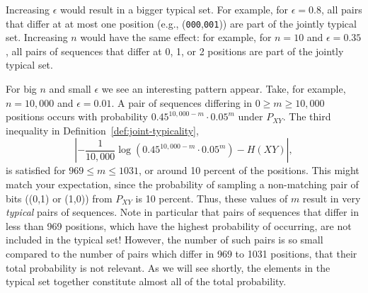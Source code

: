 \begin{example}
Increasing $\epsilon$ would result in a bigger typical set. For example, for $\epsilon = 0.8$, all pairs that differ at at most one position (e.g., (\texttt{000},\texttt{001})) are part of the jointly typical set. Increasing $n$ would have the same effect: for example, for $n = 10$ and $\epsilon = 0.35$, all pairs of sequences that differ at 0, 1, or 2 positions are part of the jointly typical set.

For big $n$ and small $\epsilon$ we see an interesting pattern appear. Take, for example, $n = 10,000$ and $\epsilon = 0.01$. A pair of sequences differing in $0 \geq m \geq 10,000$ positions occurs with probability $0.45^{10,000 - m} \cdot 0.05^m$ under $P_{XY}$. The third inequality in Definition~\ref{def:joint-typicality}, 
\[
\left| -\frac{1}{10,000} \log (0.45^{10,000 - m} \cdot 0.05^m) - H(XY)\right|,
\]
is satisfied for $969 \leq m \leq 1031$, or around 10 percent of the positions. This might match your expectation, since the probability of sampling a non-matching pair of bits ((0,1) or (1,0)) from $P_{XY}$ is 10 percent. Thus, these values of $m$ result in very \emph{typical} pairs of sequences. Note in particular that pairs of sequences that differ in less than 969 positions, which have the highest probability of occurring, are not included in the typical set! However, the number of such pairs is so small compared to the number of pairs which differ in 969 to 1031 positions, that their total probability is not relevant. As we will see shortly, the elements in the typical set together constitute almost all of the total probability.
\end{example}


